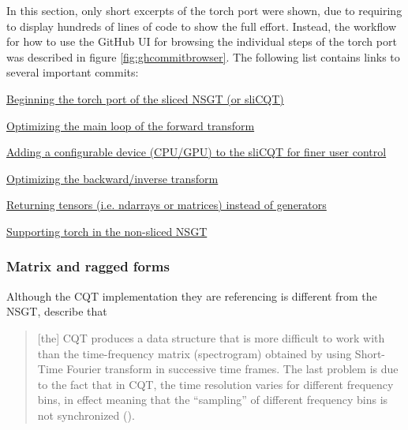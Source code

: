 \documentclass[report.tex]{subfiles}
\begin{document}
In this section, only short excerpts of the torch port were shown, due to requiring to display hundreds of lines of code to show the full effort. Instead, the workflow for how to use the GitHub UI for browsing the individual steps of the torch port was described in figure \ref{fig:ghcommitbrowser}. The following list contains links to several important commits:

\begin{tight_enumerate}
	 \item
		 \href{https://github.com/sevagh/nsgt/commit/ce9785d40d1053fcffc72115d5fbdcb28d44bf7c}{Beginning the torch port of the sliced NSGT (or sliCQT)}
	 \item
		 \href{https://github.com/sevagh/nsgt/commit/49a70d112ba4091d271a9438a8c38cf380ce62b4}{Optimizing the main loop of the forward transform}
	 \item
		 \href{https://github.com/sevagh/nsgt/commit/2d41fe002d95e4dbd1cdb76ef24aa03c95cfbe46}{Adding a configurable device (CPU/GPU) to the sliCQT for finer user control}
	 \item
		 \href{https://github.com/sevagh/nsgt/commit/9552aa1eb0735e93ce91b648a5b7f629066693b3}{Optimizing the backward/inverse transform}
	 \item
		 \href{https://github.com/sevagh/nsgt/commit/1a5886bced951af132ab8659d30a565bcade87b2}{Returning tensors (i.e. ndarrays or matrices) instead of generators}
	 \item
		 \href{https://github.com/sevagh/nsgt/commit/8d873f7dc8053c553664dcc5c0816eaf3e1ddae0}{Supporting torch in the non-sliced NSGT}
\end{tight_enumerate}

\newpagefill

\subsubsection{Matrix and ragged forms}
\label{sec:matrixvragged}

Although the CQT implementation they are referencing is different from the NSGT, \citeauthor{klapuricqt} describe that
\begin{quote}
	[the] CQT produces a data structure that is more difficult to work with than the time-frequency matrix (spectrogram) obtained by using Short-Time Fourier transform in successive time frames. The last problem is due to the fact that in CQT, the time resolution varies for different frequency bins, in effect meaning that the ``sampling'' of different frequency bins is not synchronized (\cite[1]{klapuricqt}).
\end{quote}
\end{document}
